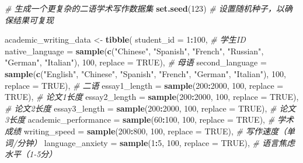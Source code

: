 \documentclass[]{book}
\newenvironment{Shaded}{\begin{snugshade}}{\end{snugshade}}
\newcommand{\CommentTok}[1]{\textcolor[rgb]{0.56,0.35,0.01}{\textit{#1}}}
\newcommand{\DataTypeTok}[1]{\textcolor[rgb]{0.13,0.29,0.53}{#1}}
\newcommand{\DecValTok}[1]{\textcolor[rgb]{0.00,0.00,0.81}{#1}}
\newcommand{\KeywordTok}[1]{\textcolor[rgb]{0.13,0.29,0.53}{\textbf{#1}}}
\newcommand{\NormalTok}[1]{#1}
\newcommand{\OperatorTok}[1]{\textcolor[rgb]{0.81,0.36,0.00}{\textbf{#1}}}
\newcommand{\OtherTok}[1]{\textcolor[rgb]{0.56,0.35,0.01}{#1}}
\newcommand{\StringTok}[1]{\textcolor[rgb]{0.31,0.60,0.02}{#1}}
\begin{document}
\begin{Shaded}
\begin{Highlighting}[]
\CommentTok{# 生成一个更复杂的二语学术写作数据集}
\KeywordTok{set.seed}\NormalTok{(}\DecValTok{123}\NormalTok{)  }\CommentTok{# 设置随机种子，以确保结果可复现}

\NormalTok{academic_writing_data <-}\StringTok{ }\KeywordTok{tibble}\NormalTok{(}
  \DataTypeTok{student_id =} \DecValTok{1}\OperatorTok{:}\DecValTok{100}\NormalTok{,  }\CommentTok{# 学生ID}
  \DataTypeTok{native_language =} \KeywordTok{sample}\NormalTok{(}\KeywordTok{c}\NormalTok{(}\StringTok{"Chinese"}\NormalTok{, }\StringTok{"Spanish"}\NormalTok{, }\StringTok{"French"}\NormalTok{, }\StringTok{"Russian"}\NormalTok{, }\StringTok{"German"}\NormalTok{, }\StringTok{"Italian"}\NormalTok{), }\DecValTok{100}\NormalTok{, }\DataTypeTok{replace =} \OtherTok{TRUE}\NormalTok{),  }\CommentTok{# 母语}
  \DataTypeTok{second_language =} \KeywordTok{sample}\NormalTok{(}\KeywordTok{c}\NormalTok{(}\StringTok{"English"}\NormalTok{, }\StringTok{"Chinese"}\NormalTok{, }\StringTok{"Spanish"}\NormalTok{, }\StringTok{"French"}\NormalTok{, }\StringTok{"German"}\NormalTok{, }\StringTok{"Italian"}\NormalTok{), }\DecValTok{100}\NormalTok{, }\DataTypeTok{replace =} \OtherTok{TRUE}\NormalTok{),  }\CommentTok{# 二语}
  \DataTypeTok{essay1_length =} \KeywordTok{sample}\NormalTok{(}\DecValTok{200}\OperatorTok{:}\DecValTok{2000}\NormalTok{, }\DecValTok{100}\NormalTok{, }\DataTypeTok{replace =} \OtherTok{TRUE}\NormalTok{),  }\CommentTok{# 论文1长度}
  \DataTypeTok{essay2_length =} \KeywordTok{sample}\NormalTok{(}\DecValTok{200}\OperatorTok{:}\DecValTok{2000}\NormalTok{, }\DecValTok{100}\NormalTok{, }\DataTypeTok{replace =} \OtherTok{TRUE}\NormalTok{),  }\CommentTok{# 论文2长度}
  \DataTypeTok{essay3_length =} \KeywordTok{sample}\NormalTok{(}\DecValTok{200}\OperatorTok{:}\DecValTok{2000}\NormalTok{, }\DecValTok{100}\NormalTok{, }\DataTypeTok{replace =} \OtherTok{TRUE}\NormalTok{),  }\CommentTok{# 论文3长度}
  \DataTypeTok{academic_performance =} \KeywordTok{sample}\NormalTok{(}\DecValTok{60}\OperatorTok{:}\DecValTok{100}\NormalTok{, }\DecValTok{100}\NormalTok{, }\DataTypeTok{replace =} \OtherTok{TRUE}\NormalTok{),  }\CommentTok{# 学术成绩}
  \DataTypeTok{writing_speed =} \KeywordTok{sample}\NormalTok{(}\DecValTok{200}\OperatorTok{:}\DecValTok{800}\NormalTok{, }\DecValTok{100}\NormalTok{, }\DataTypeTok{replace =} \OtherTok{TRUE}\NormalTok{),  }\CommentTok{# 写作速度（单词/分钟）}
  \DataTypeTok{language_anxiety =} \KeywordTok{sample}\NormalTok{(}\DecValTok{1}\OperatorTok{:}\DecValTok{5}\NormalTok{, }\DecValTok{100}\NormalTok{, }\DataTypeTok{replace =} \OtherTok{TRUE}\NormalTok{),  }\CommentTok{# 语言焦虑水平（1-5分）}

\end{Highlighting}
\end{Shaded}
\end{document}

